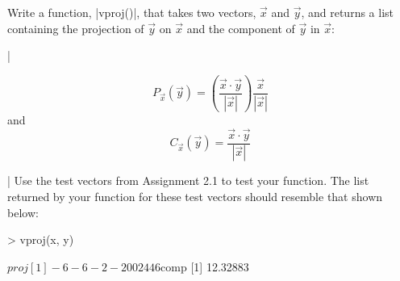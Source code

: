 \begin{assignment}
Write a function, |vproj()|, that takes two vectors, $\vec{x}$ and $\vec{y}$, and returns a list containing the projection of $\vec{y}$ on $\vec{x}$ and the component of $\vec{y}$ in $\vec{x}$:

\lstDeleteShortInline|

\[P_{\vec{x}}(\vec{y}) = \left(\frac{\vec{x} \cdot \vec{y}}{|\vec{x}|}\right) \frac{\vec{x}}{|\vec{x}|}\]
and
\[C_{\vec{x}}(\vec{y}) = \frac{\vec{x} \cdot \vec{y}}{|\vec{x}|}\]

\lstMakeShortInline|
Use the test vectors from Assignment 2.1 to test your function.  The list returned by your function for these test vectors should resemble that shown below:
\begin{R}
> vproj(x, y)

$proj
 [1] -6 -6 -2 -2  0  0  2  4  4  6

$comp
[1] 12.32883  
\end{R}
\end{assignment}

